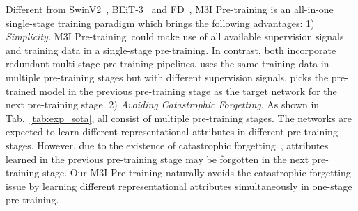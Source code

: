 \documentclass[10pt,twocolumn,letterpaper]{article}
\def\name{M3I Pre-training}
\begin{document}
Different from SwinV2~\cite{liu2022swin}, BEiT-3~\cite{wang2022image} and FD~\cite{wei2022contrastive}, \name{} is an all-in-one single-stage training paradigm which brings the following advantages: 1) \textit{Simplicity.} \name{}\ could make use of all available supervision signals and training data in a single-stage pre-training. In contrast, both \cite{liu2022swin, wang2022image} incorporate redundant multi-stage pre-training pipelines. \cite{liu2022swin} uses the same training data in multiple pre-training stages but with different supervision signals. \cite{wang2022image} picks the pre-trained model in the previous pre-training stage as the target network for the next pre-training stage.  2) \textit{Avoiding Catastrophic Forgetting}. As shown in Tab.~\ref{tab:exp_sota}, \cite{liu2022swin,wang2022image,wei2022contrastive} all consist of multiple pre-training stages. The networks are expected to learn different representational attributes in different pre-training stages. However, due to the existence of catastrophic forgetting~\cite{french1999catastrophic}, attributes learned in the previous pre-training stage may be forgotten in the next pre-training stage.
Our \name{} naturally avoids the catastrophic forgetting issue by learning different representational attributes simultaneously in one-stage pre-training.
\end{document}
